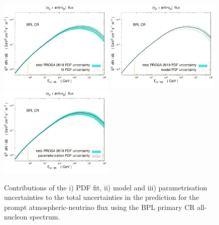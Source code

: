 \documentclass[12pt]{article}
\begin{document}
\begin{figure}
\centering
    \includegraphics[width=0.49\textwidth]{figs/pdfunc_prosa19_fit_py8.pdf}
    \includegraphics[width=0.49\textwidth]{figs/pdfunc_prosa19_model_py8.pdf}
    \includegraphics[width=0.49\textwidth]{figs/pdfunc_prosa19_param_py8.pdf}
\caption{\label{fig2prompt} Contributions of the i) PDF fit, ii) model and iii) parametrisation uncertainties to the total uncertainties in the prediction for the prompt atmospheric-neutrino flux using the BPL primary CR all-nucleon spectrum.}  
\end{figure}
\end{document}
